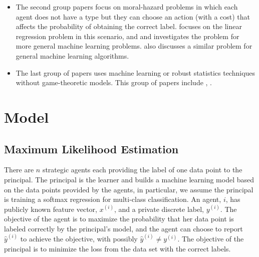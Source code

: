 \documentclass{article}
\begin{document}
\begin{itemize}
\item The second group papers focus on moral-hazard problems in which each agent does not have a type but they can choose an action (with a cost) that affects the probability of obtaining the correct label. \citet*{richardsonprivately} focuses on the linear regression problem in this scenario, and \citet*{cai2015optimum} and \citet*{shah2016double} investigates the problem for more general machine learning problems. \citet*{mihailescu2010strategy} also discusses a similar problem for general machine learning algorithms.
\item The last group of papers uses machine learning or robust statistics techniques without game-theoretic models. This group of papers include \citet*{dekel2009vox}, \citet*{dekel2009good}.
\end{itemize}



\section{Model} 

\subsection{Maximum Likelihood Estimation}
There are $n $ strategic agents each providing the label of one data point to the principal. The principal is the learner and builds a machine learning model based on the data points provided by the agents, in particular, we assume the principal is training a softmax regression for multi-class classification. An agent, $i $, has publicly known feature vector, $x^{\left(i\right)}$, and a private discrete label, $y^{\left(i\right)}$. The objective of the agent is to maximize the probability that her data point is labeled correctly by the principal's model, and the agent can choose to report $\hat{y} ^{\left(i\right)}$ to achieve the objective, with possibly $\hat{y} ^{\left(i\right)} \neq  y^{\left(i\right)}$. The objective of the principal is to minimize the loss from the data set with the correct labels.
\newline \newline
\end{document}
